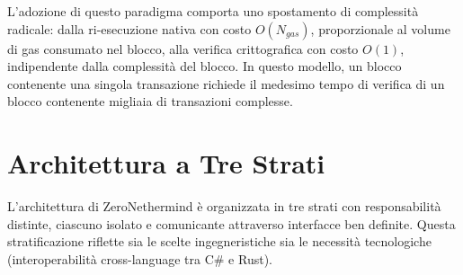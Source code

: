\documentclass[12pt,a4paper,openright,twoside]{report}
\begin{document}
L'adozione di questo paradigma comporta uno spostamento di complessità radicale: dalla ri-esecuzione nativa con costo $O(N_{gas})$, proporzionale al volume di gas consumato nel blocco, alla verifica crittografica con costo $O(1)$, indipendente dalla complessità del blocco. In questo modello, un blocco contenente una singola transazione richiede il medesimo tempo di verifica di un blocco contenente migliaia di transazioni complesse.

\section{Architettura a Tre Strati}

L'architettura di ZeroNethermind è organizzata in tre strati con responsabilità distinte, ciascuno isolato e comunicante attraverso interfacce ben definite. Questa stratificazione riflette sia le scelte ingegneristiche sia le necessità tecnologiche (interoperabilità cross-language tra C\# e Rust).
\end{document}
